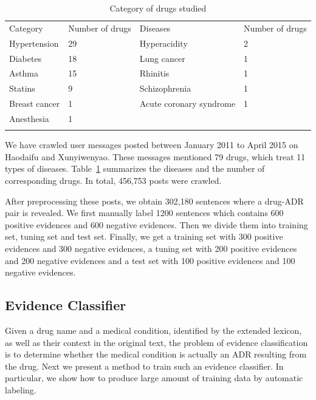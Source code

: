 \begin{table}
\centering
	\caption{Category of drugs studied}
	\label{tab:2}       %
	\begin{tabular}{llll}
		\hline\noalign{\smallskip}
		Category & Number of drugs & Diseases & Number of drugs \\
		\noalign{\smallskip}\hline
		Hypertension & 29 & Hyperacidity & 2 \\
		Diabetes & 18 & Lung cancer & 1 \\
		Asthma & 15 & Rhinitis & 1 \\
		Statins & 9 & Schizophrenia & 1 \\
		Breast cancer & 1 & Acute coronary syndrome & 1 \\
		Anesthesia & 1 \\
		\noalign{\smallskip}\hline
	\end{tabular}
\end{table}


We have crawled user messages posted between January 2011 to April 2015 on Haodaifu and Xunyiwenyao. These messages mentioned 79 drugs, which treat 11 types of diseases. Table~\ref{tab:2} summarizes the diseases and the number of corresponding drugs. In total, 456,753 posts were crawled.

After preprocessing these posts, we obtain 302,180 sentences where a drug-ADR pair is revealed. We first manually label 1200 sentences which contains 600 positive evidences and 600 negative evidences. Then we divide them into training set, tuning set and test set. Finally, we get a training set with 300 positive evidences and 300 negative evidences, a tuning set with 200 positive evidences and 200 negative evidences and a test set with 100 positive evidences and 100 negative evidences.

\subsection{Evidence Classifier}
\label{subsec:2.3}
Given a drug name and a medical condition, identified by the extended lexicon, as well as their context in the original text, the problem of evidence classification is to determine whether the medical condition is actually an ADR resulting from the drug. Next we present a method to train such an evidence classifier. In particular, we show how to produce large amount of training data by automatic labeling.

